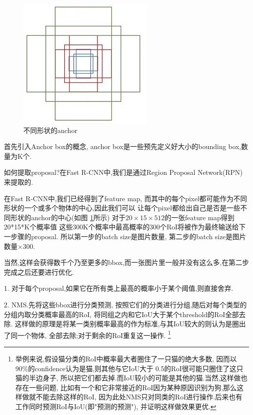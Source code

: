 \begin{figure}[htbp]
    \centering
    \includegraphics[scale=0.7]{figures/anchor.jpg}
    \caption{不同形状的anchor}
    \label{fig:anchor}
\end{figure}

首先引入Anchor box的概念, anchor box是一些预先定义好大小的bounding box,数量为K个.

如何提取proposal?在Fast R-CNN中,我们是通过Region Proposal Network(RPN)来提取的.

在Fast R-CNN中,我们已经得到了feature map,
而其中的每个pixel都可能作为不同形状的一个或多个物体的中心,因此我们可以
让每个pixel都给出自己是否是一些不同形状的anchor的中心(如图 \ref{fig:anchor}所示)
对于$20\times 15\times 512$的一张feature map得到20*15*K个概率值
这些300K个概率中最高概率的300个RoI将被作为最终输送给下一步骤的proposal.
所以第一步的batch size是图片数量, 第二步的batch size是图片数量$\times$300.


当然,这样会获得数千个乃至更多的bbox,而一张图片里一般并没有这么多,在第二步完成之后还要进行优化.

1. 对于每个proposal,如果它在所有类上最高的概率小于某个阈值,则直接舍弃.

2. NMS.先将这些bbox进行分类预测,
按照它们的分类进行分组,随后对每个类型的分组内取分类概率最高的RoI,
将同组之内和它IoU大于某个threshold的RoI全部去除.
这样做的原理是将某一类别概率最高的作为标准,与其IoU较大的则认为是圈出了同一个物体,
全部去除;对于剩余的RoI重复这一操作.
\footnote{举例来说,假设猫分类的RoI中概率最大者圈住了一只猫的绝大多数,
因而以90\%的confidence认为是猫,则其他与它IoU大于
0.5的RoI很可能只圈住了这只猫的半边身子,
所以把它们都去掉.而IoU较小的可能是其他的猫.当然,这样做也存在一些问题,
比如有一个和它非常接近的RoI因为某种原因识别为狗,那么这样做就不能去除这样的RoI,
因为此处NMS只对同类的RoI进行操作.后来也有工作同时预测RoI与IoU(即"预测的预测"),
并证明这样做效果更优.}

